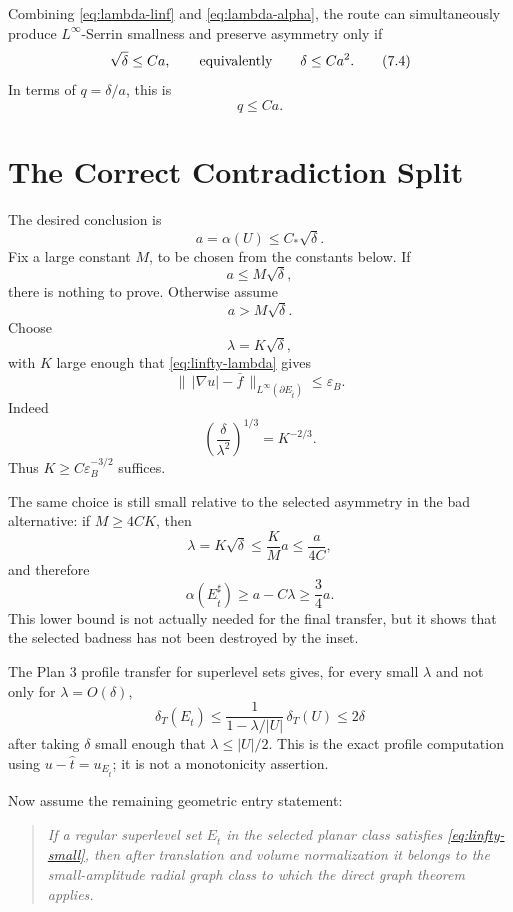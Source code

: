 \documentclass[11pt]{article}
\newcommand{\dT}{\delta_T}
\begin{document}
Combining \eqref{eq:lambda-linf} and \eqref{eq:lambda-alpha}, the route can
simultaneously produce \(L^\infty\)-Serrin smallness and preserve asymmetry
only if
\[
   \sqrt{\delta}\le C a,
   \qquad\hbox{equivalently}\qquad
   \delta\le C a^2.
   \tag{7.4}\label{eq:delta-alpha2}
\]
In terms of \(q=\delta/a\), this is
\[
   q\le C a.
   \tag{7.5}
\]

\section{The Correct Contradiction Split}

The desired conclusion is
\[
   a=\alpha(U)\le C_*\sqrt\delta.
\]
Fix a large constant \(M\), to be chosen from the constants below.  If
\[
   a\le M\sqrt\delta,
\]
there is nothing to prove.  Otherwise assume
\[
   a>M\sqrt\delta.
   \tag{8.1}\label{eq:bad-alt}
\]
Choose
\[
   \lambda=K\sqrt\delta,
   \tag{8.2}\label{eq:lambda-sqrt}
\]
with \(K\) large enough that \eqref{eq:linfty-lambda} gives
\[
   \|\,|\nabla u|-\bar f\,\|_{L^\infty(\partial E_{\hat t})}
      \le \varepsilon_B.
   \tag{8.3}\label{eq:linfty-small}
\]
Indeed
\[
   \left(\frac{\delta}{\lambda^2}\right)^{1/3}
      =
   K^{-2/3}.
\]
Thus \(K\ge C\varepsilon_B^{-3/2}\) suffices.

The same choice is still small relative to the selected asymmetry in the bad
alternative: if \(M\ge 4CK\), then
\[
   \lambda=K\sqrt\delta\le \frac{K}{M}a\le \frac{a}{4C},
\]
and therefore
\[
   \alpha(E_{\hat t}^{\sharp})
      \ge a-C\lambda
      \ge \frac34 a.
   \tag{8.4}\label{eq:alpha-preserved-bad}
\]
This lower bound is not actually needed for the final transfer, but it shows
that the selected badness has not been destroyed by the inset.

The Plan 3 profile transfer for superlevel sets gives, for every small
\(\lambda\) and not only for \(\lambda=O(\delta)\),
\[
   \dT(E_{\hat t})
      \le
   \frac{1}{1-\lambda/|U|}\,\dT(U)
      \le
   2\delta
   \tag{8.5}\label{eq:deficit-transfer-sqrt}
\]
after taking \(\delta\) small enough that \(\lambda\le |U|/2\).  This is the
exact profile computation using \(u-\hat t=u_{E_{\hat t}}\); it is not a
monotonicity assertion.

Now assume the remaining geometric entry statement:

\begin{quote}
\emph{If a regular superlevel set \(E_{\hat t}\) in the selected planar
class satisfies \eqref{eq:linfty-small}, then after translation and volume
normalization it belongs to the small-amplitude radial graph class to which
the direct graph theorem applies.}
\end{quote}
\end{document}
